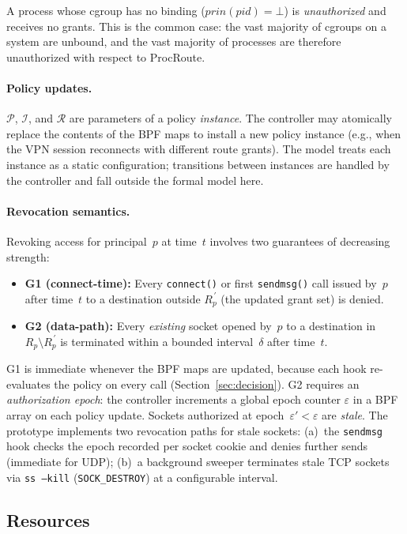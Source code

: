 \documentclass[sigconf]{acmart}
\begin{document}
A process whose cgroup has no binding
($\mathit{prin}(\mathit{pid}) = \bot$) is \emph{unauthorized} and
receives no grants.  This is the common case: the vast majority
of cgroups on a system are unbound, and the vast majority of
processes are therefore unauthorized with respect to ProcRoute.

\paragraph{Policy updates.}
$\mathcal{P}$, $\mathcal{I}$, and $\mathcal{R}$ are parameters of
a policy \emph{instance}.  The controller may atomically replace
the contents of the BPF maps to install a new policy instance
(e.g., when the VPN session reconnects with different route
grants).  The model treats each instance as a static
configuration; transitions between instances are handled by the
controller and fall outside the formal model here.

\paragraph{Revocation semantics.}
Revoking access for principal~$p$ at time~$t$ involves two
guarantees of decreasing strength:
\begin{itemize}
  \item \textbf{G1 (connect-time):}
    Every \texttt{connect()} or first \texttt{sendmsg()}
    call issued by~$p$ after time~$t$ to a destination
    outside $R_p^{\,\prime}$ (the updated grant set) is
    denied.
  \item \textbf{G2 (data-path):}
    Every \emph{existing} socket opened by~$p$ to a
    destination in $R_p \setminus R_p^{\,\prime}$ is
    terminated within a bounded interval~$\delta$
    after time~$t$.
\end{itemize}
G1 is immediate whenever the BPF maps are updated, because each
hook re-evaluates the policy on every call
(Section~\ref{sec:decision}).
G2 requires an \emph{authorization epoch}: the controller
increments a global epoch counter $\varepsilon$ in a BPF array
on each policy update.
Sockets authorized at epoch~$\varepsilon' < \varepsilon$ are
\emph{stale}.  The prototype implements two revocation paths
for stale sockets:
(a)~the \texttt{sendmsg} hook checks the epoch recorded per
socket cookie and denies further sends (immediate for UDP);
(b)~a background sweeper terminates stale TCP sockets via
\texttt{ss~--kill} (\texttt{SOCK\_DESTROY}) at a configurable
interval.

\subsection{Resources}
\end{document}
